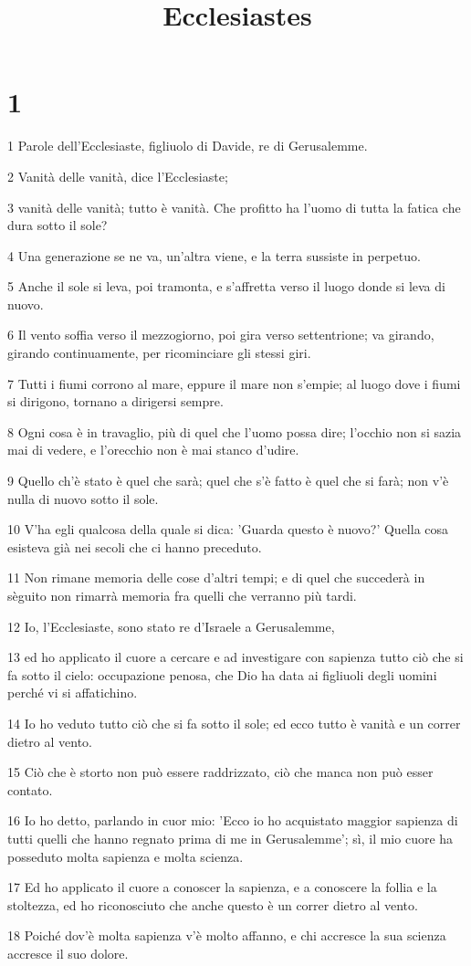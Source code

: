 

\title{Ecclesiastes}


\chapter{1}

\par 1 Parole dell'Ecclesiaste, figliuolo di Davide, re di Gerusalemme.
\par 2 Vanità delle vanità, dice l'Ecclesiaste;
\par 3 vanità delle vanità; tutto è vanità. Che profitto ha l'uomo di tutta la fatica che dura sotto il sole?
\par 4 Una generazione se ne va, un'altra viene, e la terra sussiste in perpetuo.
\par 5 Anche il sole si leva, poi tramonta, e s'affretta verso il luogo donde si leva di nuovo.
\par 6 Il vento soffia verso il mezzogiorno, poi gira verso settentrione; va girando, girando continuamente, per ricominciare gli stessi giri.
\par 7 Tutti i fiumi corrono al mare, eppure il mare non s'empie; al luogo dove i fiumi si dirigono, tornano a dirigersi sempre.
\par 8 Ogni cosa è in travaglio, più di quel che l'uomo possa dire; l'occhio non si sazia mai di vedere, e l'orecchio non è mai stanco d'udire.
\par 9 Quello ch'è stato è quel che sarà; quel che s'è fatto è quel che si farà; non v'è nulla di nuovo sotto il sole.
\par 10 V'ha egli qualcosa della quale si dica: 'Guarda questo è nuovo?' Quella cosa esisteva già nei secoli che ci hanno preceduto.
\par 11 Non rimane memoria delle cose d'altri tempi; e di quel che succederà in sèguito non rimarrà memoria fra quelli che verranno più tardi.
\par 12 Io, l'Ecclesiaste, sono stato re d'Israele a Gerusalemme,
\par 13 ed ho applicato il cuore a cercare e ad investigare con sapienza tutto ciò che si fa sotto il cielo: occupazione penosa, che Dio ha data ai figliuoli degli uomini perché vi si affatichino.
\par 14 Io ho veduto tutto ciò che si fa sotto il sole; ed ecco tutto è vanità e un correr dietro al vento.
\par 15 Ciò che è storto non può essere raddrizzato, ciò che manca non può esser contato.
\par 16 Io ho detto, parlando in cuor mio: 'Ecco io ho acquistato maggior sapienza di tutti quelli che hanno regnato prima di me in Gerusalemme'; sì, il mio cuore ha posseduto molta sapienza e molta scienza.
\par 17 Ed ho applicato il cuore a conoscer la sapienza, e a conoscere la follia e la stoltezza, ed ho riconosciuto che anche questo è un correr dietro al vento.
\par 18 Poiché dov'è molta sapienza v'è molto affanno, e chi accresce la sua scienza accresce il suo dolore.


